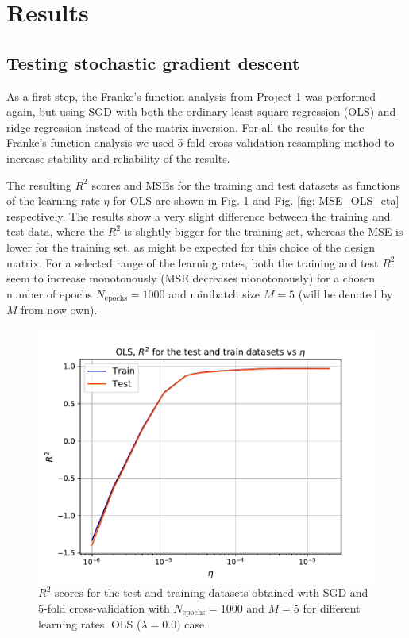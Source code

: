 \documentclass{emulateapj}
\begin{document}
\hspace{1cm}
\section{Results} 
\label{sec: Results}

\subsection{Testing stochastic gradient descent}
\label{subsec: Task 1}
As a first step, the Franke's  function analysis from Project 1 was performed again, but using SGD with both the ordinary least square regression (OLS) and ridge regression instead of the matrix inversion. For all the results for the Franke's function analysis we used 5-fold cross-validation resampling method to increase stability and reliability of the results.

The resulting $R^{2}$ scores and MSEs for the training and test datasets as functions of the learning rate $\eta$ for OLS are shown in Fig. \ref{fig: R2_OLS_eta} and Fig. \ref{fig: MSE_OLS_eta} respectively. The results show a very slight difference between the training and test data, where the $R^{2}$ is slightly bigger for the training set, whereas the MSE is lower for the training set, as might be expected for this choice of the design matrix. For a selected range of the learning rates, both the training and test $R^{2}$ seem to increase monotonously (MSE decreases monotonously) for a chosen number of epochs $N_{\mathrm{epochs}}=1000$ and minibatch size $M=5$ (will be denoted by $M$ from now own).

\begin{figure}[!htb]
    \centering
    \includegraphics[width=.49\textwidth]{Figures/OLS_R2_eta.pdf}
    \caption{$R^2$ scores for the test and training datasets obtained with SGD and 5-fold cross-validation with $N_{\mathrm{epochs}}=1000$ and $M=5$ for different learning rates. OLS ($\lambda=0.0)$ case.}
    \label{fig: R2_OLS_eta}
\end{figure}
\end{document}

